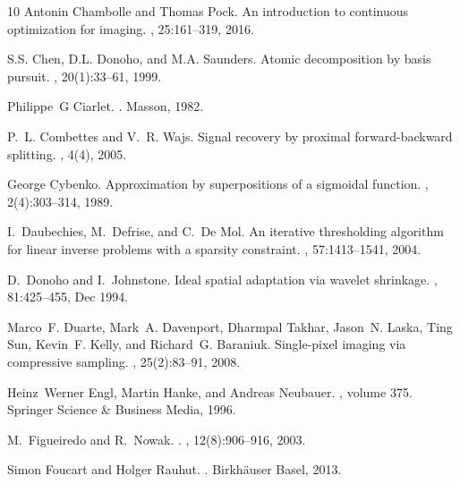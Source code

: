 \begin{thebibliography}{10}
Antonin Chambolle and Thomas Pock.
\newblock An introduction to continuous optimization for imaging.
, 25:161--319, 2016.

S.S. Chen, D.L. Donoho, and M.A. Saunders.
\newblock Atomic decomposition by basis pursuit.
, 20(1):33--61, 1999.

Philippe~G Ciarlet.
.
\newblock Masson, 1982.

P.~L. Combettes and V.~R. Wajs.
\newblock Signal recovery by proximal forward-backward splitting.
, 4(4), 2005.

George Cybenko.
\newblock Approximation by superpositions of a sigmoidal function.
, 2(4):303--314,
  1989.

I.~Daubechies, M.~Defrise, and C.~De Mol.
\newblock An iterative thresholding algorithm for linear inverse problems with
  a sparsity constraint.
, 57:1413--1541, 2004.

D.~Donoho and I.~Johnstone.
\newblock Ideal spatial adaptation via wavelet shrinkage.
, 81:425--455, Dec 1994.

Marco~F. Duarte, Mark~A. Davenport, Dharmpal Takhar, Jason~N. Laska, Ting Sun,
  Kevin~F. Kelly, and Richard~G. Baraniuk.
\newblock Single-pixel imaging via compressive sampling.
, 25(2):83--91, 2008.

Heinz~Werner Engl, Martin Hanke, and Andreas Neubauer.
, volume 375.
\newblock Springer Science \& Business Media, 1996.

M.~Figueiredo and R.~Nowak.
.
, 12(8):906--916, 2003.

Simon Foucart and Holger Rauhut.
.
\newblock Birkh{\"a}user Basel, 2013.


\end{thebibliography}
